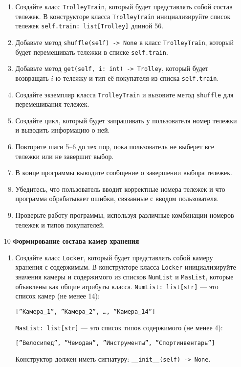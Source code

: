 \begin{enumerate}
\begin{enumerate}
    \item Создайте класс \texttt{TrolleyTrain}, который будет представлять собой состав тележек. В конструкторе класса \texttt{TrolleyTrain} инициализируйте список тележек \texttt{self.train: list[Trolley]} длиной 56.

    \item Добавьте метод \texttt{shuffle(self) -> None} в класс \texttt{TrolleyTrain}, который будет перемешивать тележки в списке \texttt{self.train}.

    \item Добавьте метод \texttt{get(self, i: int) -> Trolley}, который будет возвращать $i$-ю тележку и тип её покупателя из списка \texttt{self.train}.

    \item Создайте экземпляр класса \texttt{TrolleyTrain} и вызовите метод \texttt{shuffle} для перемешивания тележек.

    \item Создайте цикл, который будет запрашивать у пользователя номер тележки и выводить информацию о ней.

    \item Повторите шаги 5–6 до тех пор, пока пользователь не выберет все тележки или не завершит выбор.

    \item В конце программы выводите сообщение о завершении выбора тележек.

    \item Убедитесь, что пользователь вводит корректные номера тележек и что программа обрабатывает ошибки, связанные с вводом пользователя.

    \item Проверьте работу программы, используя различные комбинации номеров тележек и типов покупателей.
\end{enumerate}

\item[10] \textbf{Формирование состава камер хранения}
\begin{enumerate}
    \item Создайте класс \texttt{Locker}, который будет представлять собой камеру хранения с содержимым. В конструкторе класса \texttt{Locker} инициализируйте значения камеры и содержимого из списков \texttt{NumList} и \texttt{MasList}, которые объявлены как общие атрибуты класса. \texttt{NumList: list[str]} — это список камер (не менее 14): 
    \begin{center}
        \texttt{[''Камера\_1'', ''Камера\_2'', \dots, ''Камера\_14'']}
    \end{center}
    \texttt{MasList: list[str]} — это список типов содержимого (не менее 4):
    \begin{center}
        \texttt{[''Велосипед'', ''Чемодан'', ''Инструменты'', ''Спортинвентарь'']}
    \end{center}
    Конструктор должен иметь сигнатуру: \texttt{\_\_init\_\_(self) -> None}.


\end{enumerate}
\end{enumerate}
